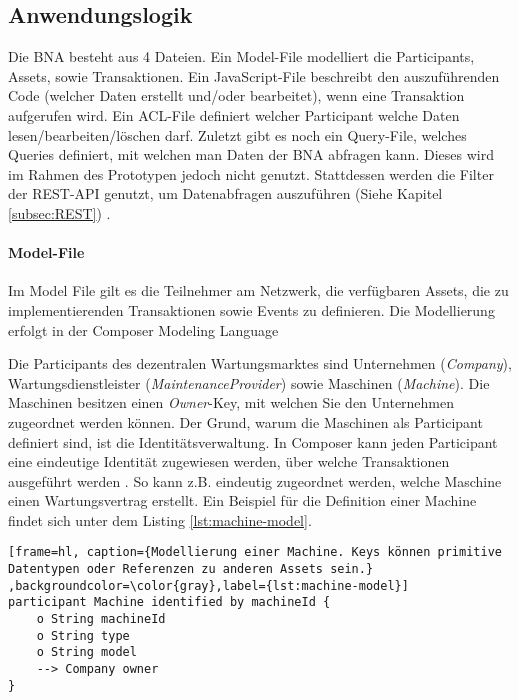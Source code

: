 \subsection{Anwendungslogik}
Die BNA besteht aus 4 Dateien. Ein Model-File modelliert die Participants, Assets, sowie Transaktionen. Ein JavaScript-File beschreibt den auszuführenden Code (welcher Daten erstellt und/oder bearbeitet), wenn eine Transaktion aufgerufen wird. Ein ACL-File definiert welcher Participant welche Daten lesen/bearbeiten/löschen darf. Zuletzt gibt es noch ein Query-File, welches Queries definiert, mit welchen man Daten der BNA abfragen kann. Dieses wird im Rahmen des Prototypen jedoch nicht genutzt. Stattdessen werden die Filter der REST-API genutzt, um Datenabfragen auszuführen (Siehe Kapitel \ref{subsec:REST}) \cite{HyperledgerComposerTeamIntroductionHyperledgerComposer}.

\paragraph{Model-File}
Im Model File gilt es die Teilnehmer am Netzwerk, die verfügbaren Assets, die zu implementierenden Transaktionen sowie Events zu definieren. Die Modellierung erfolgt in der Composer Modeling Language \cite{ModelingLanguageHyperledger}

Die Participants des dezentralen Wartungsmarktes sind Unternehmen (\textit{Company}), Wartungsdienstleister (\textit{MaintenanceProvider}) sowie Maschinen (\textit{Machine}). Die Maschinen besitzen einen \textit{Owner}-Key, mit welchen Sie den Unternehmen zugeordnet werden können. Der Grund, warum die Maschinen als Participant definiert sind, ist die Identitätsverwaltung. In Composer kann jeden Participant eine eindeutige Identität zugewiesen werden, über welche Transaktionen ausgeführt werden \cite{ParticipantsidentitiesHyperledger}. So kann z.B. eindeutig zugeordnet werden, welche Maschine einen Wartungsvertrag erstellt. Ein Beispiel für die Definition einer Machine findet sich unter dem Listing \ref{lst:machine-model}.

\begin{lstfloat}
\begin{lstlisting}[frame=hl, caption={Modellierung einer Machine. Keys können primitive Datentypen oder Referenzen zu anderen Assets sein.} ,backgroundcolor=\color{gray},label={lst:machine-model}]
participant Machine identified by machineId {
    o String machineId
    o String type
    o String model
    --> Company owner
}
\end{lstlisting} 
\end{lstfloat}

